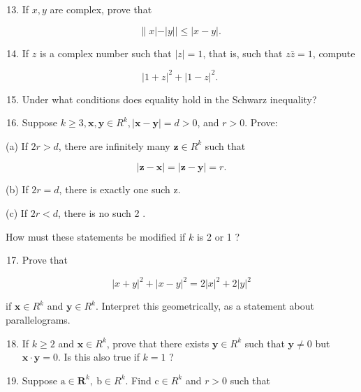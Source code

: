 \documentclass[10pt]{article}
\begin{document}
\begin{enumerate}
  \setcounter{enumi}{12}
  \item If $x, y$ are complex, prove that
\end{enumerate}

$$
\| x|-| y|| \leq|x-y| \text {. }
$$

\begin{enumerate}
  \setcounter{enumi}{13}
  \item If $z$ is a complex number such that $|z|=1$, that is, such that $z \bar{z}=1$, compute
\end{enumerate}

$$
|1+z|^{2}+|1-z|^{2} \text {. }
$$

\begin{enumerate}
  \setcounter{enumi}{14}
  \item Under what conditions does equality hold in the Schwarz inequality?

  \item Suppose $k \geq 3, \mathbf{x}, \mathbf{y} \in R^{k},|\mathbf{x}-\mathbf{y}|=d>0$, and $r>0$. Prove:

\end{enumerate}

(a) If $2 r>d$, there are infinitely many $\mathbf{z} \in R^{k}$ such that

$$
|\mathbf{z}-\mathbf{x}|=|\mathbf{z}-\mathbf{y}|=r .
$$

(b) If $2 r=d$, there is exactly one such $\mathrm{z}$.

(c) If $2 r<d$, there is no such 2 .

How must these statements be modified if $k$ is 2 or 1 ?

\begin{enumerate}
  \setcounter{enumi}{16}
  \item Prove that
\end{enumerate}

$$
|x+y|^{2}+|x-y|^{2}=2|x|^{2}+2|y|^{2}
$$

if $\mathbf{x} \in R^{k}$ and $\mathbf{y} \in R^{k}$. Interpret this geometrically, as a statement about parallelograms.

\begin{enumerate}
  \setcounter{enumi}{17}
  \item If $k \geq 2$ and $\mathbf{x} \in R^{k}$, prove that there exists $\mathbf{y} \in R^{k}$ such that $\mathbf{y} \neq 0$ but $\mathbf{x} \cdot \mathbf{y}=0$. Is this also true if $k=1$ ?

  \item Suppose $\mathrm{a} \in \boldsymbol{R}^{k}, \mathrm{~b} \in R^{k}$. Find $\mathrm{c} \in R^{k}$ and $r>0$ such that

\end{enumerate}
\end{document}

